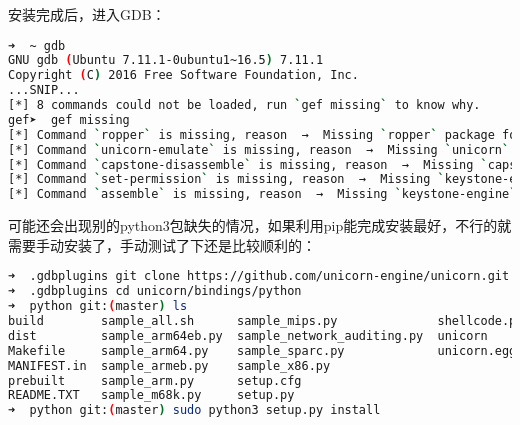 \documentclass[12pt]{article}  %
\begin{document}
安装完成后，进入GDB：
\begin{lstlisting}[language=sh]
➜  ~ gdb
GNU gdb (Ubuntu 7.11.1-0ubuntu1~16.5) 7.11.1
Copyright (C) 2016 Free Software Foundation, Inc.
...SNIP...
[*] 8 commands could not be loaded, run `gef missing` to know why.
gef➤  gef missing
[*] Command `ropper` is missing, reason  →  Missing `ropper` package for Python3, install with: `pip3 install ropper`.
[*] Command `unicorn-emulate` is missing, reason  →  Missing `unicorn` package for Python3. Install with `pip3 install unicorn`.
[*] Command `capstone-disassemble` is missing, reason  →  Missing `capstone` package for Python3. Install with `pip3 install capstone`.
[*] Command `set-permission` is missing, reason  →  Missing `keystone-engine` package for Python3, install with: `pip3 install keystone-engine`.
[*] Command `assemble` is missing, reason  →  Missing `keystone-engine` package for Python3, install with: `pip3 install keystone-engine`.


\end{lstlisting}\par
可能还会出现别的python3包缺失的情况，如果利用pip能完成安装最好，不行的就需要手动安装了，手动测试了下还是比较顺利的：\par
\begin{lstlisting}[language=sh]
➜  .gdbplugins git clone https://github.com/unicorn-engine/unicorn.git 
➜  .gdbplugins cd unicorn/bindings/python      
➜  python git:(master) ls
build        sample_all.sh      sample_mips.py              shellcode.py
dist         sample_arm64eb.py  sample_network_auditing.py  unicorn
Makefile     sample_arm64.py    sample_sparc.py             unicorn.egg-info
MANIFEST.in  sample_armeb.py    sample_x86.py
prebuilt     sample_arm.py      setup.cfg
README.TXT   sample_m68k.py     setup.py
➜  python git:(master) sudo python3 setup.py install
\end{lstlisting}\par
\end{document}
